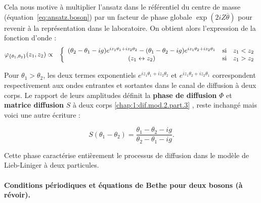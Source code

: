 Cela nous motive à multiplier l’ansatz dans le référentiel du centre de masse (équation~\eqref{eq:ansatz.boson}) par un facteur de phase globale \(\exp(2iZ\overline{\theta})\) pour revenir à la représentation dans le laboratoire. On obtient alors l’expression de la fonction d’onde :
\begin{eqnarray}\label{eq:I-1-10}
	\varphi_{\{\theta_1 , \theta_2\}}(z_1 , z_2) & \propto &  \left \{ \begin{array} { c cl} ( \theta_2 - \theta_1 - ig) e^{ i z_1 \theta_1 + iz_2 \theta_2 } - ( \theta_1 - \theta_2 - ig) e^{ i z_1 \theta_2 + iz_2 \theta_1} & \mbox{si} & z_1 < z_2 \\ (z_1 \leftrightarrow z_2) & \mbox{si} & z_1 > z_2 \end{array} \right.
\end{eqnarray}



Pour \(\theta_1 > \theta_2\), les deux termes exponentiels 
\(e^{i z_1 \theta_1 + i z_2 \theta_2}\) et \(e^{i z_1 \theta_2 + i z_2 \theta_1}\)
correspondent respectivement aux ondes entrantes et sortantes dans le canal de diffusion à deux corps.  
Le rapport de leurs amplitudes définit la {\bf phase de diffusion} $\Phi$ et  {\bf matrice diffusion} $S$  à deux corps \eqref{chap:1:dif.mod.2.part.3} , reste inchangé mais voici une autre écriture :

\begin{equation}\label{chap:1:dif.mod.2.part.4}
	S(\theta_1- \theta_2)  
	= \frac{\theta_1 - \theta_2 - ig}{\theta_2 - \theta_1 - ig}.
\end{equation}

Cette phase caractérise entièrement le processus de diffusion dans le modèle de Lieb-Liniger à deux particules.

\paragraph{Conditions périodiques et équations de Bethe pour deux bosons {\color{red}(à révoir)}.}

